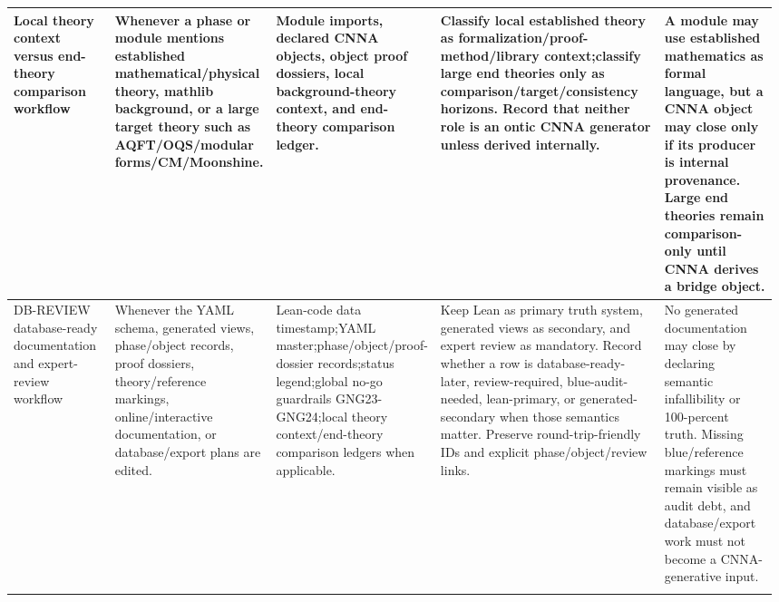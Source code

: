 \begin{longtable}{L{0.14\linewidth} L{0.19\linewidth} L{0.18\linewidth} L{0.31\linewidth} L{0.16\linewidth}}
Local theory context versus end-theory comparison workflow & Whenever a phase or module mentions established mathematical/\allowbreak{}physical theory, mathlib background, or a large target theory such as AQFT/\allowbreak{}OQS/\allowbreak{}modular forms/\allowbreak{}CM/\allowbreak{}Moonshine. & Module imports, declared CNNA objects, object proof dossiers, local background-theory context, and end-theory comparison ledger. & Classify local established theory as formalization/\allowbreak{}proof-method/\allowbreak{}library context;\newline classify large end theories only as comparison/\allowbreak{}target/\allowbreak{}consistency horizons. Record that neither role is an ontic CNNA generator unless derived internally. & A module may use established mathematics as formal language, but a CNNA object may close only if its producer is internal provenance. Large end theories remain comparison-only until CNNA derives a bridge object.\\
\hline
\addlinespace[0.24em]
DB-REVIEW database-ready documentation and expert-review workflow & Whenever the YAML schema, generated views, phase/\allowbreak{}object records, proof dossiers, theory/\allowbreak{}reference markings, online/\allowbreak{}interactive documentation, or database/\allowbreak{}export plans are edited. & Lean-code data timestamp;\newline YAML master;\newline phase/\allowbreak{}object/\allowbreak{}proof-dossier records;\newline status legend;\newline global no-go guardrails GNG23-GNG24;\newline local theory context/\allowbreak{}end-theory comparison ledgers when applicable. & Keep Lean as primary truth system, generated views as secondary, and expert review as mandatory. Record whether a row is database-ready-later, review-required, blue-audit-needed, lean-primary, or generated-secondary when those semantics matter. Preserve round-trip-friendly IDs and explicit phase/\allowbreak{}object/\allowbreak{}review links. & No generated documentation may close by declaring semantic infallibility or 100-percent truth. Missing blue/\allowbreak{}reference markings must remain visible as audit debt, and database/\allowbreak{}export work must not become a CNNA-generative input.\\
\hline
\addlinespace[0.24em]

\end{longtable}
